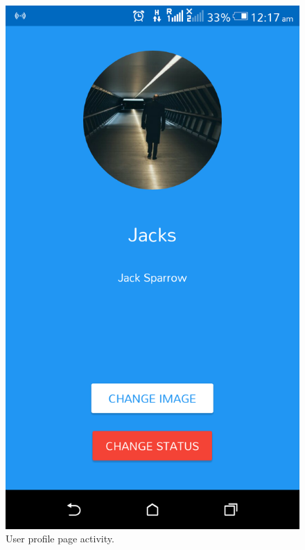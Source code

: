 \noindent
\begin{figure}[!ht]
	\centering
	\includegraphics[scale=0.2]{profile-page.png}
	\caption{\label{img16}  User profile page activity.}
\end{figure}

